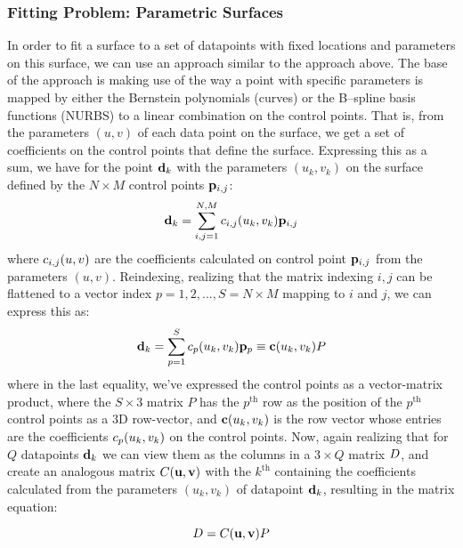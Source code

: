 \subsubsection{Fitting Problem: Parametric Surfaces}
In order to fit a \Bez surface to a set of datapoints with fixed locations and parameters on this surface, we can use an approach similar to the approach above. The base of the approach is making use of the way a point with specific parameters is mapped by either the Bernstein polynomials (\Bez curves) or the B--spline basis functions (NURBS) to a linear combination on the control points. That is, from the parameters $(u,v)$ of each data point on the surface, we get a set of coefficients on the control points that define the surface. Expressing this as a sum, we have for the point $\lsDataPointi{k}$ with the parameters $(u_k,v_k)$ on the surface defined by the $N \times M$ control points $\lsControlPointi{i,j}$:
\begin{equation}
\lsDataPointi{k} = \sum\limits_{i,j=1}^{N,M} \lsControlPointCoefi{i,j}(u_k,v_k) \lsControlPointi{i,j}
\end{equation} 
where $\lsControlPointCoefi{i,j}(u,v)$ are the coefficients calculated on control point $\lsControlPointi{i,j}$ from the parameters $(u,v)$. Reindexing, realizing that the matrix indexing $i,j$ can be flattened to a vector index $p = 1,2,...,S=N\times M$ mapping to $i$ and $j$, we can express this as:
\begin{equation}
\lsDataPointi{k} = \sum\limits_{p=1}^{S} \lsControlPointCoefi{p}(u_k,v_k) \lsControlPointi{p} \equiv \vec{\lsControlPointCoef}(u_k,v_k)\lsControlPointMatrix
\label{eqn:lsmatrix1}
\end{equation} 
where in the last equality, we've expressed the control points as a vector-matrix product, where the $S\times 3$ matrix $P$ has the $p^\text{th}$ row as the position of the $p^\text{th}$ control points as a 3D row-vector, and $\vec{\lsControlPointCoef}(u_k,v_k)$ is the row vector whose entries are the coefficients $\lsControlPointCoefi{p}(u_k,v_k)$ on the control points. Now, again realizing that for $Q$ datapoints $\lsDataPointi{k}$ we can view them as the columns in a $3\times Q$ matrix $\lsDataPointMatrix$, and create an analogous matrix $\lsControlPointCoefMatrix(\vec{u},\vec{v})$ with the $k^\text{th}$ containing the coefficients calculated from the parameters $(u_k,v_k)$ of datapoint $\lsDataPointi{k}$, resulting in the matrix equation:

\begin{equation}
\lsDataPointMatrix = \lsControlPointCoefMatrix(\vec{u},\vec{v})\lsControlPointMatrix
\label{eqn:lsmatrix2}
\end{equation}

